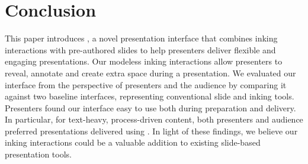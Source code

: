 \section{Conclusion}
This paper introduces \interface, a novel presentation interface that combines inking interactions with pre-authored slides to help presenters deliver flexible and engaging presentations.
%
Our modeless inking interactions allow presenters to reveal, annotate and create extra space during a presentation. We evaluated our interface from the perspective of presenters and the audience by comparing it against two baseline interfaces, representing conventional slide and inking tools. Presenters found our interface easy to use both during preparation and delivery. In particular, for text-heavy, process-driven content, both presenters and audience preferred presentations delivered using \interface. 
%
In light of these findings, we believe our inking interactions could be a valuable addition to existing slide-based presentation tools.
